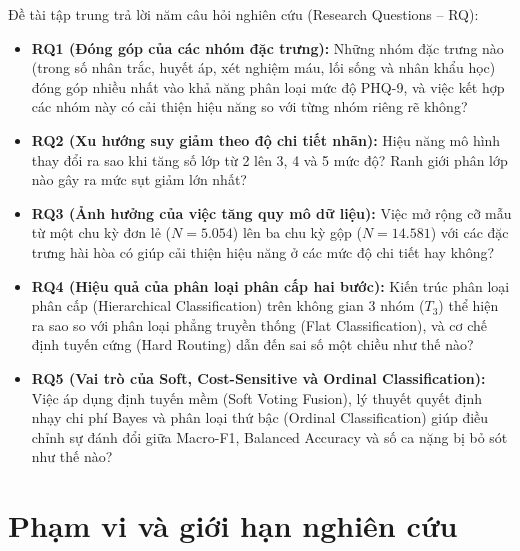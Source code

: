 Đề tài tập trung trả lời năm câu hỏi nghiên cứu (Research Questions -- RQ):
\begin{itemize}
    \item \textbf{RQ1 (Đóng góp của các nhóm đặc trưng):} Những nhóm đặc trưng nào (trong số nhân trắc, huyết áp, xét nghiệm máu, lối sống và nhân khẩu học) đóng góp nhiều nhất vào khả năng phân loại mức độ PHQ-9, và việc kết hợp các nhóm này có cải thiện hiệu năng so với từng nhóm riêng rẽ không?
    \item \textbf{RQ2 (Xu hướng suy giảm theo độ chi tiết nhãn):} Hiệu năng mô hình thay đổi ra sao khi tăng số lớp từ 2 lên 3, 4 và 5 mức độ? Ranh giới phân lớp nào gây ra mức sụt giảm lớn nhất?
    \item \textbf{RQ3 (Ảnh hưởng của việc tăng quy mô dữ liệu):} Việc mở rộng cỡ mẫu từ một chu kỳ đơn lẻ ($N = 5.054$) lên ba chu kỳ gộp ($N = 14.581$) với các đặc trưng hài hòa có giúp cải thiện hiệu năng ở các mức độ chi tiết hay không?
    \item \textbf{RQ4 (Hiệu quả của phân loại phân cấp hai bước):} Kiến trúc phân loại phân cấp (Hierarchical Classification) trên không gian 3 nhóm ($T_3$) thể hiện ra sao so với phân loại phẳng truyền thống (Flat Classification), và cơ chế định tuyến cứng (Hard Routing) dẫn đến sai số một chiều như thế nào?
    \item \textbf{RQ5 (Vai trò của Soft, Cost-Sensitive và Ordinal Classification):} Việc áp dụng định tuyến mềm (Soft Voting Fusion), lý thuyết quyết định nhạy chi phí Bayes và phân loại thứ bậc (Ordinal Classification) giúp điều chỉnh sự đánh đổi giữa Macro-F1, Balanced Accuracy và số ca nặng bị bỏ sót như thế nào?
\end{itemize}

\section{Phạm vi và giới hạn nghiên cứu}
\label{sec:pham-vi-nghien-cuu}

